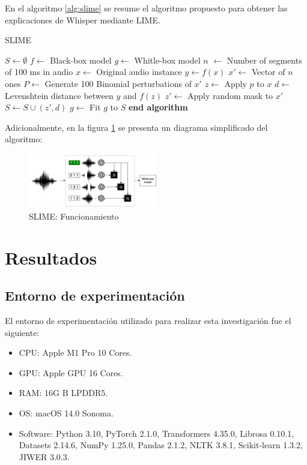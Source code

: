 \documentclass[conference]{IEEEtran}
\begin{document}
En el algoritmo \ref{alg:slime} se resume el algoritmo propuesto para obtener las explicaciones de Whisper mediante LIME.

\begin{algorithm}[H]
\caption{SLIME}
\begin{algorithmic}[1]
\State $S \gets \emptyset$
\State $f \gets$ Black-box model
\State $g \gets $ Whitle-box model
\State $n$ $\gets$ Number of segments of 100 ms in audio
\State $x \gets$ Original audio instance
\State $y \gets f(x)$
\State $x' \gets$ Vector of $n$ ones
\State $P \gets$ Generate 100 Binomial perturbations of $x'$
    \State $z \gets$ Apply $p$ to $x$
    \State $d \gets$  Levenshtein distance between $y$ and $f(z)$
    \State $z' \gets$ Apply random mask to $x'$
    \State $S \gets S \cup (z', d)$
\EndFor
\State $g \gets$ Fit $g$ to $S$
\State \textbf{end algorithm}
\end{algorithmic}
\label{alg:slime}
\end{algorithm}

Adicionalmente, en la figura \ref{fig:diagram} se presenta un diagrama simplificado del algoritmo:

\begin{figure}[ht]
\centerline{\includegraphics[width=0.5\textwidth]{./images/diagram.png}}
\caption{SLIME: Funcionamiento}
\label{fig:diagram}
\end{figure}


\section{Resultados} \label{6-Results}

\subsection{Entorno de experimentación}
El entorno de experimentación utilizado para realizar esta investigación fue el siguiente:
\begin{itemize}
    \item CPU: Apple M1 Pro 10 Cores.
    \item GPU: Apple GPU 16 Cores.
    \item RAM: 16G B LPDDR5.
    \item OS: macOS 14.0 Sonoma.
    \item Software: Python 3.10, PyTorch 2.1.0, Transformers 4.35.0, Librosa 0.10.1, Datasets 2.14.6, NumPy 1.25.0, Pandas 2.1.2, NLTK 3.8.1, Scikit-learn 1.3.2, JIWER 3.0.3.
\end{itemize}
\end{document}
